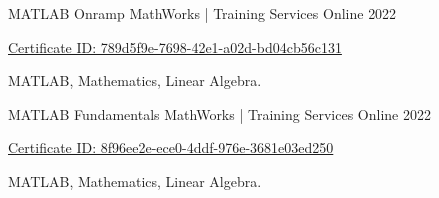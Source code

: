 \begin{cventries}
	
	\cventry
	{MATLAB Onramp} %
	{MathWorks | Training Services} %
	{Online} %
	{2022} %
	{
		\begin{cvitems} %
			\item {\href{https://matlabacademy.mathworks.com/progress/share/certificate.html?id=8f96ee2e-ece0-4ddf-976e-3681e03ed250\&/}{Certificate ID: 789d5f9e-7698-42e1-a02d-bd04cb56c131}}
			\item { MATLAB, Mathematics, Linear Algebra.}
		\end{cvitems}
	}
	
	
		
	\cventry
	{MATLAB Fundamentals} %
	{MathWorks | Training Services} %
	{Online} %
	{2022} %
	{
		\begin{cvitems} %
			\item {\href{https://matlabacademy.mathworks.com/progress/share/certificate.html?id=789d5f9e-7698-42e1-a02d-bd04cb56c131\&/}{Certificate ID: 8f96ee2e-ece0-4ddf-976e-3681e03ed250}}
			\item { MATLAB, Mathematics, Linear Algebra.}
		\end{cvitems}
	}
	
	

\end{cventries}
